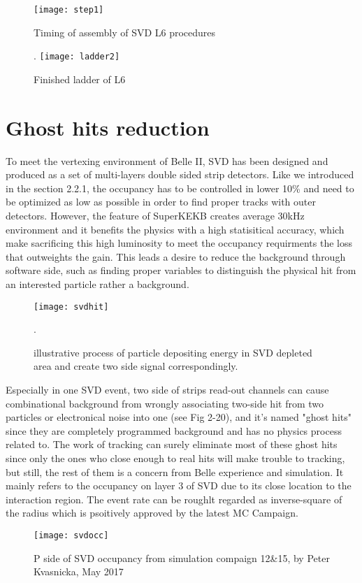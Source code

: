 \begin{figure}[htbp]
	\centering
	\texttt{[image: step1]}
	\caption{Timing of assembly of SVD L6 procedures\cite{shimizu}}. 
	\texttt{[image: ladder2]}
	\caption{Finished ladder of L6}
\end{figure}

\section{Ghost hits reduction}
	To meet the vertexing environment of Belle II, SVD has been designed and produced as a set of multi-layers double sided strip detectors. Like we introduced in the section 2.2.1, the occupancy has to be controlled in lower 10\% and need to be optimized as low as possible in order to find proper tracks with outer detectors. 
	However, the feature of SuperKEKB creates average 30kHz environment and it benefits the physics with a high statisitical accuracy, which make sacrificing this high luminosity to meet the occupancy requirments the loss that outweights the gain. This leads a desire to reduce the background through software side, such as finding proper variables to distinguish the physical hit from an interested particle rather a background. 
	
	\begin{figure}[htbp]
		\centering
		\texttt{[image: svdhit]}
		\caption{illustrative process of particle depositing energy in SVD depleted area and create two side signal correspondingly.}. 
	\end{figure}
	
	Especially in one SVD event, two side of strips read-out channels can cause combinational background from wrongly associating two-side hit from two particles or electronical noise into one (see Fig 2-20), and it's named "ghost hits" since they are completely programmed background and has no physics process related to. The work of tracking can surely eliminate most of these ghost hits since only the ones who close enough to real hits will make trouble to tracking, but still,  the rest of them is a concern from Belle experience and simulation. It mainly refers to the occupancy on layer 3 of SVD due to its close location to the interaction region. The event rate can be roughlt regarded as inverse-square of the radius which is psoitively approved by the latest MC Campaign.
	
	\begin{figure}[htbp]
		\centering
		\texttt{[image: svdocc]}
		\caption{P side of SVD occupancy from simulation compaign 12\&15, by Peter Kvasnicka, May 2017}
	\end{figure}
	
